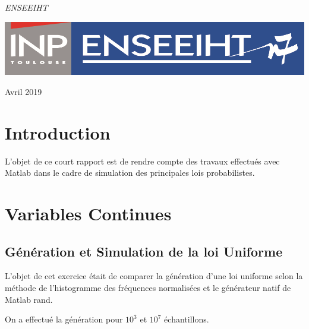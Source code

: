 \documentclass[a4paper,oneside]{article}
\begin{document}
\begin{titlepage}
	\vspace{0.5\baselineskip} %

	\textit{ENSEEIHT} %

	\vfill %


	\includegraphics[scale=0.8]{logoN7.png} %

	\vspace{0.3\baselineskip} %

Avril 2019 %
\end{titlepage}
\newpage

\tableofcontents
\newpage


\section{Introduction}

L'objet de ce court rapport est de rendre compte des travaux effectués avec Matlab dans le cadre de simulation des principales lois probabilistes.

\section{Variables Continues}

\subsection{Génération et Simulation de la loi Uniforme}

L'objet de cet exercice était de comparer la génération d'une loi uniforme selon la méthode de l'histogramme des fréquences normalisées et le générateur natif de Matlab rand.

On a effectué la génération pour $10^3$ et $10^7$ échantillons.  
\end{document}
